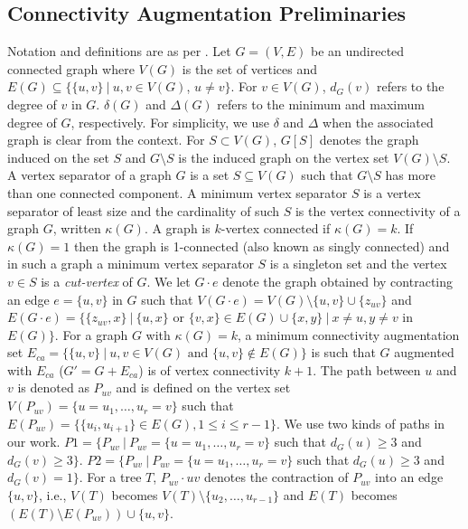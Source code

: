 \documentclass[runningheads]{llncs}
\begin{document}
\subsection{Connectivity Augmentation Preliminaries}
Notation and definitions are as per \cite{golu,west}.  Let $G =(V,E)$ be an undirected connected graph where $V(G)$ is the set of vertices and $E(G) \subseteq \{\{u,v\}~|~ u,v \in V(G)$, $u \not= v \}$. For $v \in V(G)$, $d_G(v)$ refers to the degree of $v$ in $G$.  $\delta(G)$ and $\Delta(G)$ refers to the minimum and maximum degree of $G$, respectively.  For simplicity, we use $\delta$ and $\Delta$ when the associated graph is clear from the context. For $S \subset V(G)$, $G[S]$ denotes the graph induced on the set $S$ and $G \setminus S$ is the induced graph on the vertex set $V(G) \setminus S$.  A vertex separator of a graph $G$ is a set $S \subseteq V(G)$ such that $G \setminus S$ has more than one connected component.  A minimum vertex separator $S$ is a vertex separator  of least size and the cardinality of such $S$ is the vertex connectivity of a graph $G$, written  $\kappa(G)$.  A graph is $k$-vertex connected if $\kappa(G)=k$.  If $\kappa(G)=1$ then the graph is 1-connected (also known as singly connected) and in such a graph a minimum vertex separator $S$ is a singleton set and the vertex $v \in S$ is a {\em cut-vertex} of $G$. We let $G \cdot e$ denote the graph obtained by contracting an edge $e=\{u,v\}$ in $G$ such that $V(G \cdot e)=V(G)\setminus\{u,v\}\cup\{z_{uv}\}$ and $E(G \cdot e)=\{ \{z_{uv},x\} ~|~ \{u,x\}$ or $\{v,x\} \in E(G) \cup \{x,y\} ~|~ x \not= u, y \not= v$ in $E(G) \}$.  For a graph $G$ with $\kappa(G)=k$, a minimum connectivity augmentation set $E_{ca} = \{\{u,v\} ~|~ u,v \in V(G) \mbox{ and } \{u,v\} \notin E(G) \}$ is such that $G$ augmented with $E_{ca}$ ($G'=G + E_{ca}$) is of vertex connectivity $k+1$.  The path between $u$ and $v$ is denoted as $P_{uv}$ and is defined on the vertex set $V(P_{uv})= \{u=u_1,\ldots,u_r=v\}$ such that $E(P_{uv})=\{\{u_i,u_{i+1}\} \in E(G), 1 \leq i \leq r-1\}$.   We use two kinds of paths in our work.  $P1=\{P_{uv} ~|~ P_{uv}=\{u=u_1,\ldots,u_r=v\}$ such that $d_G(u) \geq 3$ and $d_G(v) \geq 3\}$. $P2=\{P_{uv} ~|~ P_{uv}=\{u=u_1,\ldots,u_r=v\}$ such that $d_G(u) \geq 3$ and $d_G(v)=1\}$.  For a tree $T$,  $P_{uv} \cdot uv$ denotes the contraction of $P_{uv}$ into an edge $\{u,v\}$, i.e., $V(T)$ becomes $V(T) \setminus \{u_2,\ldots,u_{r-1}\}$ and $E(T)$ becomes $(E(T) \setminus E(P_{uv})) \cup \{u,v\}$.
\end{document}
